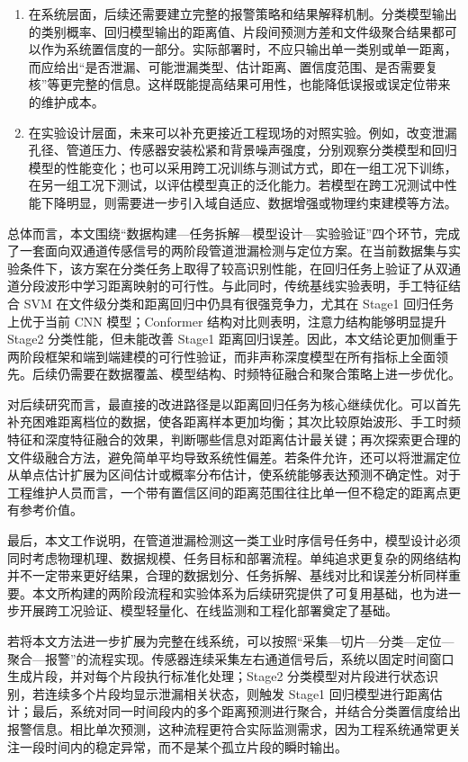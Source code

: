 \begin{enumerate}
  \item 在系统层面，后续还需要建立完整的报警策略和结果解释机制。分类模型输出的类别概率、回归模型输出的距离值、片段间预测方差和文件级聚合结果都可以作为系统置信度的一部分。实际部署时，不应只输出单一类别或单一距离，而应给出“是否泄漏、可能泄漏类型、估计距离、置信度范围、是否需要复核”等更完整的信息。这样既能提高结果可用性，也能降低误报或误定位带来的维护成本。
  \item 在实验设计层面，未来可以补充更接近工程现场的对照实验。例如，改变泄漏孔径、管道压力、传感器安装松紧和背景噪声强度，分别观察分类模型和回归模型的性能变化；也可以采用跨工况训练与测试方式，即在一组工况下训练，在另一组工况下测试，以评估模型真正的泛化能力。若模型在跨工况测试中性能下降明显，则需要进一步引入域自适应、数据增强或物理约束建模等方法。
\end{enumerate}

总体而言，本文围绕“数据构建—任务拆解—模型设计—实验验证”四个环节，完成了一套面向双通道传感信号的两阶段管道泄漏检测与定位方案。在当前数据集与实验条件下，该方案在分类任务上取得了较高识别性能，在回归任务上验证了从双通道分段波形中学习距离映射的可行性。与此同时，传统基线实验表明，手工特征结合 SVM 在文件级分类和距离回归中仍具有很强竞争力，尤其在 Stage1 回归任务上优于当前 CNN 模型；Conformer 结构对比则表明，注意力结构能够明显提升 Stage2 分类性能，但未能改善 Stage1 距离回归误差。因此，本文结论更加侧重于两阶段框架和端到端建模的可行性验证，而非声称深度模型在所有指标上全面领先。后续仍需要在数据覆盖、模型结构、时频特征融合和聚合策略上进一步优化。

对后续研究而言，最直接的改进路径是以距离回归任务为核心继续优化。可以首先补充困难距离档位的数据，使各距离样本更加均衡；其次比较原始波形、手工时频特征和深度特征融合的效果，判断哪些信息对距离估计最关键；再次探索更合理的文件级融合方法，避免简单平均导致系统性偏差。若条件允许，还可以将泄漏定位从单点估计扩展为区间估计或概率分布估计，使系统能够表达预测不确定性。对于工程维护人员而言，一个带有置信区间的距离范围往往比单一但不稳定的距离点更有参考价值。

最后，本文工作说明，在管道泄漏检测这一类工业时序信号任务中，模型设计必须同时考虑物理机理、数据规模、任务目标和部署流程。单纯追求更复杂的网络结构并不一定带来更好结果，合理的数据划分、任务拆解、基线对比和误差分析同样重要。本文所构建的两阶段流程和实验体系为后续研究提供了可复用基础，也为进一步开展跨工况验证、模型轻量化、在线监测和工程化部署奠定了基础。

若将本文方法进一步扩展为完整在线系统，可以按照“采集—切片—分类—定位—聚合—报警”的流程实现。传感器连续采集左右通道信号后，系统以固定时间窗口生成片段，并对每个片段执行标准化处理；Stage2 分类模型对片段进行状态识别，若连续多个片段均显示泄漏相关状态，则触发 Stage1 回归模型进行距离估计；最后，系统对同一时间段内的多个距离预测进行聚合，并结合分类置信度给出报警信息。相比单次预测，这种流程更符合实际监测需求，因为工程系统通常更关注一段时间内的稳定异常，而不是某个孤立片段的瞬时输出。

